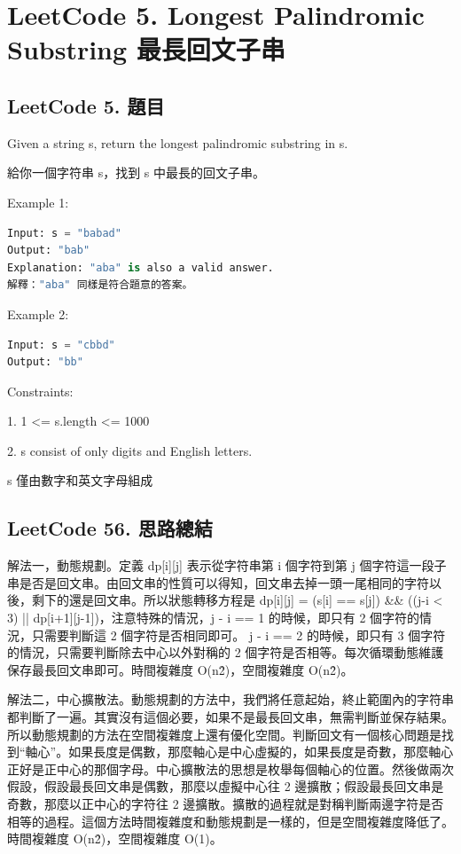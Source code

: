 \documentclass[10pt,UTF8]{ctexart}
\begin{document}
\newpage

\section{LeetCode 5. Longest Palindromic Substring 最長回文子串}

\subsection{LeetCode 5. 題目}

Given a string s, return the longest palindromic substring in s.

給你一個字符串 s，找到 s 中最長的回文子串。

Example 1:

\begin{lstlisting}[language={python}]
Input: s = "babad"
Output: "bab"
Explanation: "aba" is also a valid answer.
解釋："aba" 同樣是符合題意的答案。
\end{lstlisting}

Example 2:

\begin{lstlisting}[language={python}]
Input: s = "cbbd"
Output: "bb"
\end{lstlisting}

Constraints:

1. 1 <= s.length <= 1000

2. s consist of only digits and English letters.

s 僅由數字和英文字母組成

\subsection{LeetCode 56. 思路總結}

解法一，動態規劃。定義 dp[i][j] 表示從字符串第 i 個字符到第 j 個字符這一段子串是否是回文串。由回文串的性質可以得知，回文串去掉一頭一尾相同的字符以後，剩下的還是回文串。所以狀態轉移方程是 dp[i][j] = (s[i] == s[j]) \&\& ((j-i < 3) || dp[i+1][j-1])，注意特殊的情況，j - i == 1 的時候，即只有 2 個字符的情況，只需要判斷這 2 個字符是否相同即可。 j - i == 2 的時候，即只有 3 個字符的情況，只需要判斷除去中心以外對稱的 2 個字符是否相等。每次循環動態維護保存最長回文串即可。時間複雜度 O(n\^2)，空間複雜度 O(n\^2)。

解法二，中心擴散法。動態規劃的方法中，我們將任意起始，終止範圍內的字符串都判斷了一遍。其實沒有這個必要，如果不是最長回文串，無需判斷並保存結果。所以動態規劃的方法在空間複雜度上還有優化空間。判斷回文有一個核心問題是找到“軸心”。如果長度是偶數，那麼軸心是中心虛擬的，如果長度是奇數，那麼軸心正好是正中心的那個字母。中心擴散法的思想是枚舉每個軸心的位置。然後做兩次假設，假設最長回文串是偶數，那麼以虛擬中心往 2 邊擴散；假設最長回文串是奇數，那麼以正中心的字符往 2 邊擴散。擴散的過程就是對稱判斷兩邊字符是否相等的過程。這個方法時間複雜度和動態規劃是一樣的，但是空間複雜度降低了。時間複雜度 O(n\^2)，空間複雜度 O(1)。
\end{document}
